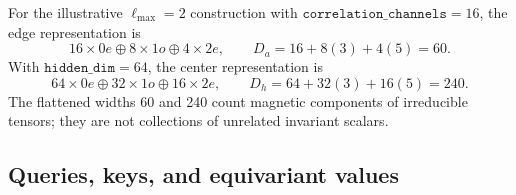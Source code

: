\documentclass[aps,prx,preprint,notitlepage,superscriptaddress,nofootinbib,floatfix]{revtex4-2}
\newif\ifshowrevisions
\newenvironment{draftthirtyoneblock}
  {\ifshowrevisions\color{draftthirtyonecolor}\fi}
  {}
\begin{document}
\begin{draftthirtyoneblock}
For the illustrative \(\ell_{\max}=2\) construction with
\(\texttt{correlation\_channels}=16\), the edge representation is
\begin{equation}
 16\times0e\oplus8\times1o\oplus4\times2e,
 \qquad
 D_a=16+8(3)+4(5)=60.
 \label{eq:app-edge-width}
\end{equation}
With \(\texttt{hidden\_dim}=64\), the center representation is
\begin{equation}
 64\times0e\oplus32\times1o\oplus16\times2e,
 \qquad
 D_h=64+32(3)+16(5)=240.
 \label{eq:app-center-width}
\end{equation}
The flattened widths 60 and 240 count magnetic components of irreducible
tensors; they are not collections of unrelated invariant scalars.

\subsection{Queries, keys, and equivariant values}


\end{draftthirtyoneblock}
\end{document}
